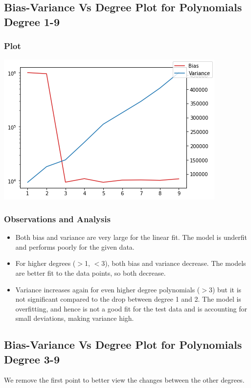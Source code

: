 \documentclass{article}
\begin{document}
\subsection{Bias-Variance Vs Degree Plot for Polynomials Degree 1-9}
\subsubsection{Plot}
\includegraphics[scale=.9]{images/1-9-2.png}
\subsubsection{Observations and Analysis}
\begin{itemize}
\item Both bias and variance are very large for the linear fit. The model is underfit and performs poorly for the given data.
\item For higher degrees ($>$1, $<$3), both bias and variance decrease. The models are better fit to the data points, so both decrease.
\item Variance increases again for even higher degree polynomials ($>$3) but it is not significant compared to the drop between degree  1 and 2. The model is overfitting, and hence is not a good fit for the test data and is accounting for small deviations, making variance high.
\end{itemize}
\subsection{Bias-Variance Vs Degree Plot for Polynomials Degree 3-9}
We remove the first point to better view the changes between the other degrees.
\end{document}
